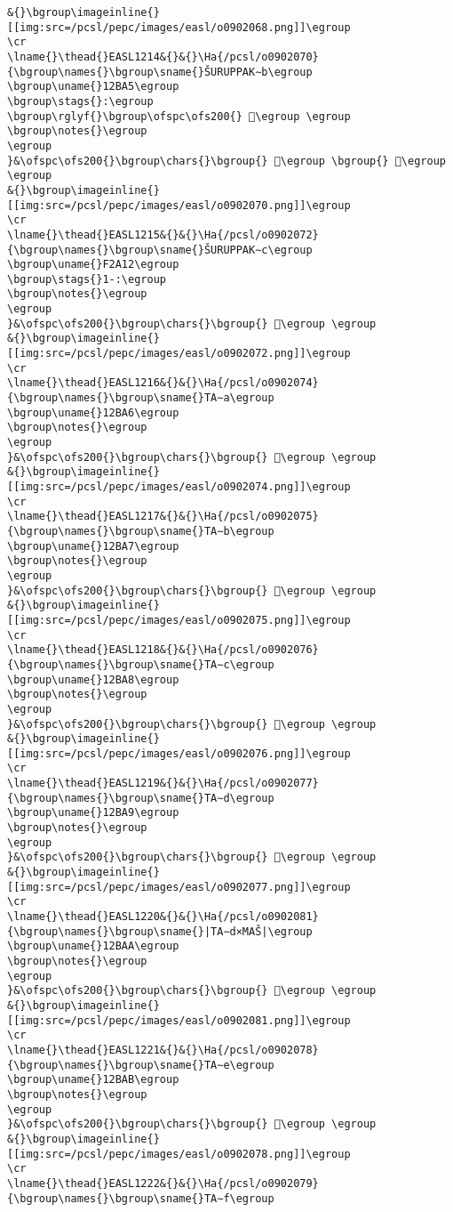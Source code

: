 \begin{verbatim}
&{}\bgroup\imageinline{}[[img:src=/pcsl/pepc/images/easl/o0902068.png]]\egroup
\cr
\lname{}\thead{}EASL1214&{}&{}\Ha{/pcsl/o0902070}{\bgroup\names{}\bgroup\sname{}ŠURUPPAK∼b\egroup
\bgroup\uname{}12BA5\egroup
\bgroup\stags{}:\egroup
\bgroup\rglyf{}\bgroup\ofspc\ofs200{} 𒮥\egroup \egroup
\bgroup\notes{}\egroup
\egroup
}&\ofspc\ofs200{}\bgroup\chars{}\bgroup{} 𒮤\egroup \bgroup{} 𒮥\egroup \egroup
&{}\bgroup\imageinline{}[[img:src=/pcsl/pepc/images/easl/o0902070.png]]\egroup
\cr
\lname{}\thead{}EASL1215&{}&{}\Ha{/pcsl/o0902072}{\bgroup\names{}\bgroup\sname{}ŠURUPPAK∼c\egroup
\bgroup\uname{}F2A12\egroup
\bgroup\stags{}1-:\egroup
\bgroup\notes{}\egroup
\egroup
}&\ofspc\ofs200{}\bgroup\chars{}\bgroup{} 󲨒\egroup \egroup
&{}\bgroup\imageinline{}[[img:src=/pcsl/pepc/images/easl/o0902072.png]]\egroup
\cr
\lname{}\thead{}EASL1216&{}&{}\Ha{/pcsl/o0902074}{\bgroup\names{}\bgroup\sname{}TA∼a\egroup
\bgroup\uname{}12BA6\egroup
\bgroup\notes{}\egroup
\egroup
}&\ofspc\ofs200{}\bgroup\chars{}\bgroup{} 𒮦\egroup \egroup
&{}\bgroup\imageinline{}[[img:src=/pcsl/pepc/images/easl/o0902074.png]]\egroup
\cr
\lname{}\thead{}EASL1217&{}&{}\Ha{/pcsl/o0902075}{\bgroup\names{}\bgroup\sname{}TA∼b\egroup
\bgroup\uname{}12BA7\egroup
\bgroup\notes{}\egroup
\egroup
}&\ofspc\ofs200{}\bgroup\chars{}\bgroup{} 𒮧\egroup \egroup
&{}\bgroup\imageinline{}[[img:src=/pcsl/pepc/images/easl/o0902075.png]]\egroup
\cr
\lname{}\thead{}EASL1218&{}&{}\Ha{/pcsl/o0902076}{\bgroup\names{}\bgroup\sname{}TA∼c\egroup
\bgroup\uname{}12BA8\egroup
\bgroup\notes{}\egroup
\egroup
}&\ofspc\ofs200{}\bgroup\chars{}\bgroup{} 𒮨\egroup \egroup
&{}\bgroup\imageinline{}[[img:src=/pcsl/pepc/images/easl/o0902076.png]]\egroup
\cr
\lname{}\thead{}EASL1219&{}&{}\Ha{/pcsl/o0902077}{\bgroup\names{}\bgroup\sname{}TA∼d\egroup
\bgroup\uname{}12BA9\egroup
\bgroup\notes{}\egroup
\egroup
}&\ofspc\ofs200{}\bgroup\chars{}\bgroup{} 𒮩\egroup \egroup
&{}\bgroup\imageinline{}[[img:src=/pcsl/pepc/images/easl/o0902077.png]]\egroup
\cr
\lname{}\thead{}EASL1220&{}&{}\Ha{/pcsl/o0902081}{\bgroup\names{}\bgroup\sname{}|TA∼d×MAŠ|\egroup
\bgroup\uname{}12BAA\egroup
\bgroup\notes{}\egroup
\egroup
}&\ofspc\ofs200{}\bgroup\chars{}\bgroup{} 𒮪\egroup \egroup
&{}\bgroup\imageinline{}[[img:src=/pcsl/pepc/images/easl/o0902081.png]]\egroup
\cr
\lname{}\thead{}EASL1221&{}&{}\Ha{/pcsl/o0902078}{\bgroup\names{}\bgroup\sname{}TA∼e\egroup
\bgroup\uname{}12BAB\egroup
\bgroup\notes{}\egroup
\egroup
}&\ofspc\ofs200{}\bgroup\chars{}\bgroup{} 𒮫\egroup \egroup
&{}\bgroup\imageinline{}[[img:src=/pcsl/pepc/images/easl/o0902078.png]]\egroup
\cr
\lname{}\thead{}EASL1222&{}&{}\Ha{/pcsl/o0902079}{\bgroup\names{}\bgroup\sname{}TA∼f\egroup

\end{verbatim}
